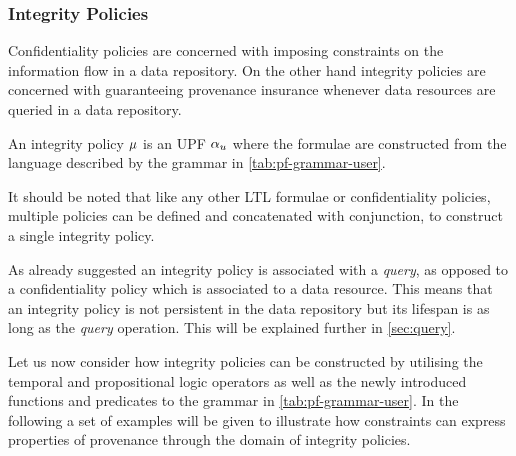 \subsubsection{Integrity Policies}
Confidentiality policies are concerned with imposing constraints on the information flow in a data repository. On the other hand integrity policies are concerned with guaranteeing provenance insurance whenever data resources are queried in a data repository.
\begin{definition}\label{def:ip}
An integrity policy $\mu$ is an UPF $\alpha_u$ where the formulae are constructed from the language described by the grammar in \autoref{tab:pf-grammar-user}.
\end{definition}
It should be noted that like any other LTL formulae or confidentiality policies, multiple policies can be defined and concatenated with conjunction, to construct a single integrity policy.

As already suggested an integrity policy is associated with a \emph{query}, as opposed to a confidentiality policy which is associated to a data resource. This means that an integrity policy is not persistent in the data repository but its lifespan is as long as the \emph{query} operation. This will be explained further in \autoref{sec:query}.

Let us now consider how integrity policies can be constructed by utilising the temporal and propositional logic operators as well as the newly introduced functions and predicates to the grammar in \autoref{tab:pf-grammar-user}. In the following a set of examples will be given to illustrate how constraints can express properties of provenance through the domain of integrity policies.

